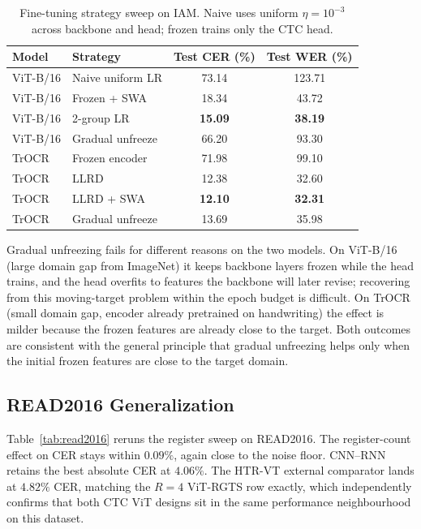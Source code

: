\begin{table}[h]
\centering
\small
\caption{Fine-tuning strategy sweep on IAM. Naive uses uniform $\eta = 10^{-3}$ across backbone and head; frozen trains only the CTC head.}
\label{tab:finetune}
\begin{tabular}{llcc}
\toprule
Model & Strategy & Test CER (\%) & Test WER (\%) \\
\midrule
ViT-B/16 & Naive uniform LR       & 73.14 & 123.71 \\
ViT-B/16 & Frozen + SWA           & 18.34 & 43.72  \\
ViT-B/16 & 2-group LR             & \textbf{15.09} & \textbf{38.19} \\
ViT-B/16 & Gradual unfreeze       & 66.20 & 93.30  \\
TrOCR    & Frozen encoder         & 71.98 & 99.10  \\
TrOCR    & LLRD                   & 12.38 & 32.60  \\
TrOCR    & LLRD + SWA             & \textbf{12.10} & \textbf{32.31} \\
TrOCR    & Gradual unfreeze       & 13.69 & 35.98  \\
\bottomrule
\end{tabular}
\end{table}

Gradual unfreezing fails for different reasons on the two models. On ViT-B/16 (large domain gap from ImageNet) it keeps backbone layers frozen while the head trains, and the head overfits to features the backbone will later revise; recovering from this moving-target problem within the epoch budget is difficult. On TrOCR (small domain gap, encoder already pretrained on handwriting) the effect is milder because the frozen features are already close to the target. Both outcomes are consistent with the general principle that gradual unfreezing helps only when the initial frozen features are close to the target domain.

\subsection{READ2016 Generalization}
\label{sec:res_read2016}

Table~\ref{tab:read2016} reruns the register sweep on READ2016. The register-count effect on CER stays within $0.09\%$, again close to the noise floor. CNN--RNN retains the best absolute CER at $4.06\%$. The HTR-VT external comparator lands at $4.82\%$ CER, matching the $R = 4$ ViT-RGTS row exactly, which independently confirms that both CTC ViT designs sit in the same performance neighbourhood on this dataset.

